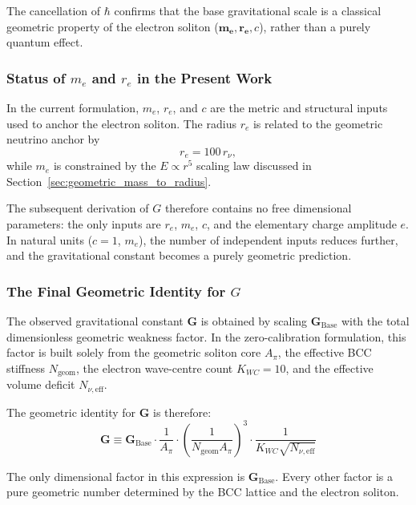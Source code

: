 \documentclass[10pt,a4paper]{article}
\begin{document}
The cancellation of $\hbar$ confirms that the base gravitational scale is a classical geometric property of the electron soliton ($\mathbf{m_e}, \mathbf{r_e}, c$), rather than a purely quantum effect.

\subsubsection*{Status of \(m_e\) and \(r_e\) in the Present Work}

In the current formulation, \(m_e\), \(r_e\), and \(c\) are the metric and structural inputs used to anchor the electron soliton. The radius \(r_e\) is related to the geometric neutrino anchor by
\begin{equation}
	r_e = 100\,r_\nu ,
\end{equation}
while \(m_e\) is constrained by the \(E \propto r^5\) scaling law discussed in Section~\ref{sec:geometric_mass_to_radius}. 

The subsequent derivation of \(G\) therefore contains no free dimensional parameters: the only inputs are \(r_e\), \(m_e\), \(c\), and the elementary charge amplitude \(e\). In natural units (\(c=1\), \(m_e\)), the number of independent inputs reduces further, and the gravitational constant becomes a purely geometric prediction.

\subsubsection*{The Final Geometric Identity for $G$}

The observed gravitational constant $\mathbf{G}$ is obtained by scaling $\mathbf{G}_{\text{Base}}$ with the total dimensionless geometric weakness factor. In the zero-calibration formulation, this factor is built solely from the geometric soliton core $A_\pi$, the effective BCC stiffness $N_{\text{geom}}$, the electron wave-centre count $K_{WC}=10$, and the effective volume deficit $N_{\nu,\text{eff}}$.

The geometric identity for $\mathbf{G}$ is therefore:
\begin{equation}
	\mathbf{G}
	\equiv
	\mathbf{G}_{\text{Base}}
	\cdot
	\frac{1}{A_\pi}
	\cdot
	\left(
	\frac{1}{N_{\text{geom}} A_\pi}
	\right)^{3}
	\cdot
	\frac{1}{K_{WC} \sqrt{N_{\nu,\text{eff}}}}
	\label{eq:G_EWT_Final_Identity}
\end{equation}

The only dimensional factor in this expression is \(\mathbf{G}_{\text{Base}}\). Every other factor is a pure geometric number determined by the BCC lattice and the electron soliton.
\end{document}
